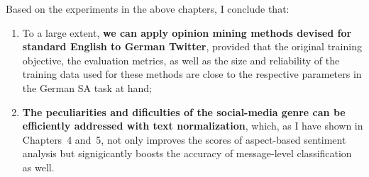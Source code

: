 \documentclass[11pt]{article}
\begin{document}
Based on the experiments in the above chapters, I conclude that:
\begin{enumerate}
  \item To a large extent, \textbf{we can apply opinion mining methods
    devised for standard English to German Twitter}, provided that the
    original training objective, the evaluation metrics, as well as
    the size and reliability of the training data used for these
    methods are close to the respective parameters in the German SA
    task at hand;
  \item \textbf{The peculiarities and dificulties of the social-media
    genre can be efficiently addressed with text normalization},
    which, as I have shown in Chapters~4 and~5, not only improves the
    scores of aspect-based sentiment analysis but signigicantly boosts
    the accuracy of message-level classification as well.
\end{enumerate}
\end{document}
